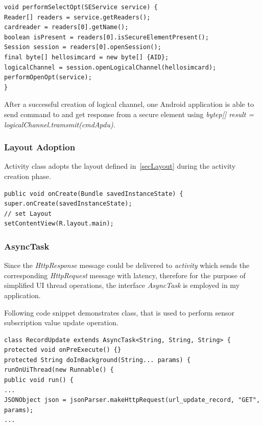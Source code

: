 \begin{Verbatim}[fontsize=\relsize{-1},frame=lines,framesep=4mm, label=\fbox{\small\emph{Service and logical channel Creation}}]
void performSelectOpt(SEService service) {
Reader[] readers = service.getReaders();
cardreader = readers[0].getName();
boolean isPresent = readers[0].isSecureElementPresent();
Session session = readers[0].openSession();
final byte[] hellosimcard = new byte[] {AID};
logicalChannel = session.openLogicalChannel(hellosimcard);
performOpenOpt(service);
}
\end{Verbatim}
After a successful creation of logical channel, one Android application is able to send command to and get response from a secure element using \emph{bytep[] result = logicalChannel.tramsmit(cmdApdu)}.
\subsubsection{Layout Adoption}
Activity class adopts the layout defined in~\ref{secLayout} during the activity creation phase.

\begin{Verbatim}[fontsize=\relsize{-1},frame=lines,framesep=4mm, label=\fbox{\small\emph{Layout Adoption}}]
public void onCreate(Bundle savedInstanceState) {
super.onCreate(savedInstanceState);
// set Layout
setContentView(R.layout.main);
\end{Verbatim}

\subsubsection{AsyncTask}
Since the \emph{HttpResponse} message could be delivered to \emph{activity} which sends the  corresponding \emph{HttpRequest} message with latency, therefore for the purpose of simplified UI thread operations, the interface \emph{AsyncTask} is employed in my application.

Following code snippet demonstrates class, that is used to perform sensor subscription value update operation. 
\begin{Verbatim}[fontsize=\relsize{-1},frame=lines,framesep=4mm, label=\fbox{\small\emph{AsyncTask HttpRequest}}]
class RecordUpdate extends AsyncTask<String, String, String> {
protected void onPreExecute() {}	
protected String doInBackground(String... params) {
runOnUiThread(new Runnable() {
public void run() {
...
JSONObject json = jsonParser.makeHttpRequest(url_update_record, "GET", params);
...
\end{Verbatim}
